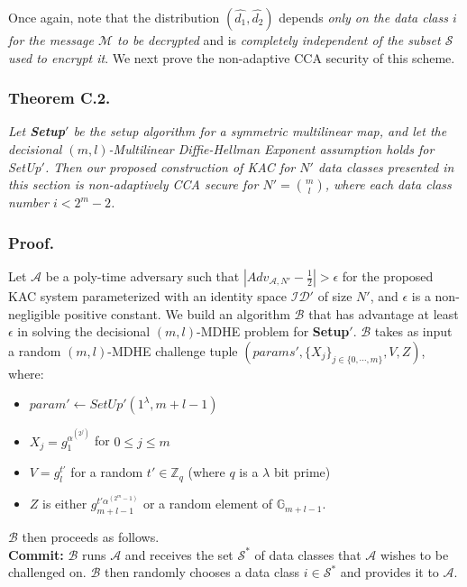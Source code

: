 Once again, note that the distribution $(\hat{d_1},\hat{d_2})$ depends \emph{only on the data class $i$ for the message $\mathcal{M}$ to be decrypted} and is \emph{completely independent of the subset $\mathcal{S}$ used to encrypt it}. We next prove the non-adaptive CCA security of this scheme. 

\subsubsection{Theorem C.2.} \textit{Let \textbf{Setup}$'$ be the setup algorithm for a symmetric multilinear map, and let the decisional $(m,l)$-Multilinear Diffie-Hellman Exponent assumption holds for {SetUp}$'$. Then our proposed construction of KAC for $N'$ data classes presented in this section is non-adaptively CCA secure for $N'=\binom{m}{l}$, where each data class number $i<2^m-2$.}

\subsubsection{Proof.} Let $\mathcal{A}$ be a poly-time adversary such that $|Adv_{\mathcal{A},N'}-\frac{1}{2}| > \epsilon$ for the proposed KAC system parameterized with an identity space $\mathcal{ID}'$ of size $N'$, and $\epsilon$ is a non-negligible positive constant. We build an algorithm $\mathcal{B}$ that has advantage at least $\epsilon$ in solving the decisional $(m,l)$-MDHE problem for \textbf{Setup}$'$. $\mathcal{B}$ takes as input a random $(m,l)$-MDHE challenge tuple $(params',\{X_j\}_{j\in\{0,\cdots,m\}},V,Z)$, where:
\begin{itemize}
 \item $param'\leftarrow SetUp'(1^{\lambda},m+l-1)$
 \item $X_j=g^{\alpha^{(2^j)}}_{1}$ for $0\leq j \leq m$
 \item $V=g^{t'}_{l}$ for a random $t'\in\mathbb{Z}_q$ (where $q$ is a $\lambda$ bit prime)
 \item $Z$ is either $g^{t'\alpha^{(2^m-1)}}_{m+l-1}$ or a random element of $\mathbb{G}_{m+l-1}$.
\end{itemize}
\noindent $\mathcal{B}$ then proceeds as follows.\\

\noindent \textbf{Commit:} $\mathcal{B}$ runs $\mathcal{A}$ and receives the set ${\mathcal{S}}^{*}$ of data classes that $\mathcal{A}$ wishes to be challenged on. $\mathcal{B}$ then randomly chooses a data class $i\in{\mathcal{S}}^{*}$ and provides it to $\mathcal{A}$.\\
 
